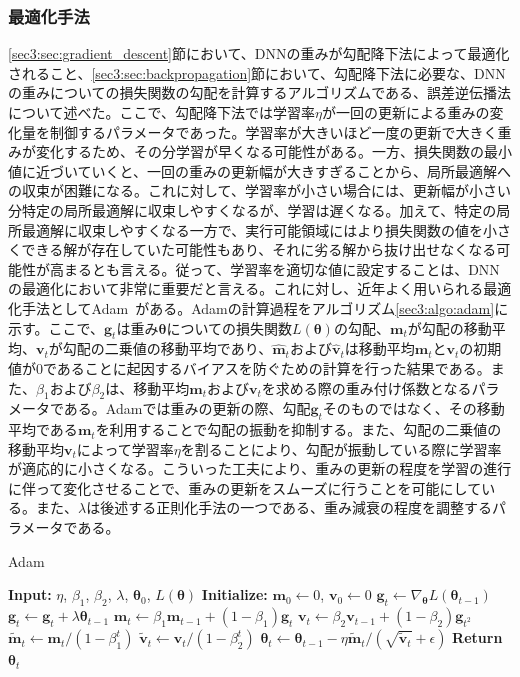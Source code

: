 \documentclass[12pt]{jarticle}
\numberwithin{equation}{section}    %
\numberwithin{figure}{section}      %
\numberwithin{table}{section}      %
\begin{document}
\subsubsection{最適化手法}
\label{sec3:sec:optimizer}
\ref{sec3:sec:gradient_descent}節において、DNNの重みが勾配降下法によって最適化されること、\ref{sec3:sec:backpropagation}節において、勾配降下法に必要な、DNNの重みについての損失関数の勾配を計算するアルゴリズムである、誤差逆伝播法について述べた。ここで、勾配降下法では学習率$\eta$が一回の更新による重みの変化量を制御するパラメータであった。学習率が大きいほど一度の更新で大きく重みが変化するため、その分学習が早くなる可能性がある。一方、損失関数の最小値に近づいていくと、一回の重みの更新幅が大きすぎることから、局所最適解への収束が困難になる。これに対して、学習率が小さい場合には、更新幅が小さい分特定の局所最適解に収束しやすくなるが、学習は遅くなる。加えて、特定の局所最適解に収束しやすくなる一方で、実行可能領域にはより損失関数の値を小さくできる解が存在していた可能性もあり、それに劣る解から抜け出せなくなる可能性が高まるとも言える。従って、学習率を適切な値に設定することは、DNNの最適化において非常に重要だと言える。これに対し、近年よく用いられる最適化手法としてAdam~\cite{kingma2014adam}がある。Adamの計算過程をアルゴリズム\ref{sec3:algo:adam}に示す。ここで、$\bm{g}_{t}$は重み$\bm{\theta}$についての損失関数$L(\bm{\theta})$の勾配、$\bm{m}_{t}$が勾配の移動平均、$\bm{v}_{t}$が勾配の二乗値の移動平均であり、$\hat{\bm{m}}_{t}$および$\hat{\bm{v}}_{t}$は移動平均$\bm{m}_{t}$と$\bm{v}_{t}$の初期値が0であることに起因するバイアスを防ぐための計算を行った結果である。また、$\beta_{1}$および$\beta_{2}$は、移動平均$\bm{m}_{t}$および$\bm{v}_{t}$を求める際の重み付け係数となるパラメータである。Adamでは重みの更新の際、勾配$\bm{g}_{t}$そのものではなく、その移動平均である$\bm{m}_{t}$を利用することで勾配の振動を抑制する。また、勾配の二乗値の移動平均$\bm{v}_{t}$によって学習率$\eta$を割ることにより、勾配が振動している際に学習率が適応的に小さくなる。こういった工夫により、重みの更新の程度を学習の進行に伴って変化させることで、重みの更新をスムーズに行うことを可能にしている。また、$\lambda$は後述する正則化手法の一つである、重み減衰の程度を調整するパラメータである。
\begin{algorithm}
    \caption{Adam}
    \label{sec3:algo:adam}
    \begin{algorithmic}[1]
        \State \textbf{Input:} $\eta$, $\beta_{1}$, $\beta_{2}$, $\lambda$, $\bm{\theta}_{0}$, $L(\bm{\theta})$
        \State \textbf{Initialize:} $\bm{m}_{0} \gets 0$, $\bm{v}_{0} \gets 0$
        \State $\bm{g}_{t} \gets \nabla_{\bm{\theta}} L(\bm{\theta}_{t-1})$
        \State $\bm{g}_t \gets \bm{g}_t + \lambda \bm{\theta}_{t-1}$
        \State $\bm{m}_{t} \gets \beta_{1} \bm{m}_{t-1} + (1 - \beta_{1}) \bm{g}_{t}$
        \State $\bm{v}_{t} \gets \beta_{2} \bm{v}_{t-1} + (1 - \beta_{2}) \bm{g}_{t^{2}}$
        \State $\tilde{\bm{m}}_{t} \gets \bm{m}_{t} / (1 - \beta_{1}^{t})$
        \State $\tilde{\bm{v}}_{t} \gets \bm{v}_{t} / (1 - \beta_{2}^{t})$
        \State $\bm{\theta}_{t} \gets \bm{\theta}_{t-1} - \eta \tilde{\bm{m}}_{t} / (\sqrt{\tilde{\bm{v}}_{t}} + \epsilon)$
        \EndFor
        \State \textbf{Return} $\bm{\theta}_{t}$
    \end{algorithmic}
\end{algorithm}
\end{document}
